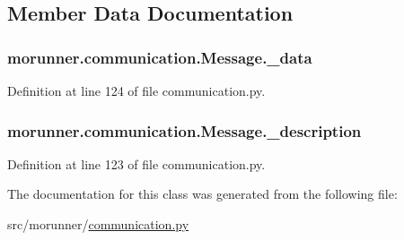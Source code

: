 \subsection{Member Data Documentation}
\hypertarget{classmorunner_1_1communication_1_1Message_a1735c0a988d7a81371b188d36913da1c}{}
\subsubsection[{\+\_\+data}]{\setlength{\rightskip}{0pt plus 5cm}morunner.\+communication.\+Message.\+\_\+data\hspace{0.3cm}{\ttfamily [private]}}\label{classmorunner_1_1communication_1_1Message_a1735c0a988d7a81371b188d36913da1c}


Definition at line 124 of file communication.\+py.

\hypertarget{classmorunner_1_1communication_1_1Message_a7645e37f561610793530a6c329ab55fe}{}
\subsubsection[{\+\_\+description}]{\setlength{\rightskip}{0pt plus 5cm}morunner.\+communication.\+Message.\+\_\+description\hspace{0.3cm}{\ttfamily [private]}}\label{classmorunner_1_1communication_1_1Message_a7645e37f561610793530a6c329ab55fe}


Definition at line 123 of file communication.\+py.



The documentation for this class was generated from the following file\+:\begin{DoxyCompactItemize}
\item 
src/morunner/\hyperlink{communication_8py}{communication.\+py}\end{DoxyCompactItemize}
